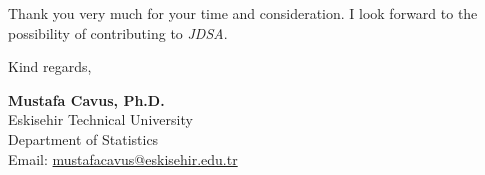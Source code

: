 \documentclass[10.5pt,a4paper]{article}
\begin{document}
Thank you very much for your time and consideration. I look forward to the possibility of contributing to \textit{JDSA}.

\vspace{0.2cm}
Kind regards,

\textbf{Mustafa Cavus, Ph.D.} \\
Eskisehir Technical University \\
Department of Statistics \\
Email: \href{mailto:mustafacavus@eskisehir.edu.tr}{mustafacavus@eskisehir.edu.tr}
\end{document}
